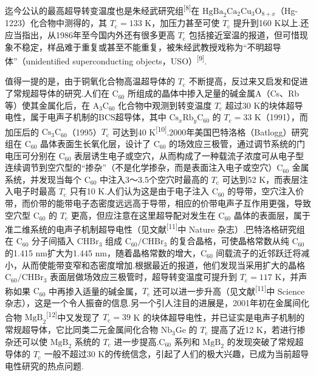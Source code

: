 迄今公认的最高超导转变温度也是朱经武研究组\textsuperscript{[8]}在 $\mathrm{HgBa}_{2}\mathrm{Ca}_{2}\mathrm{Cu}_{3}\mathrm{O}_{8+x}$（Hg-1223）化合物中测得的，其 $T_{\mathrm{c}}=133$ K，加压力甚至可使 $T_{\mathrm{c}}$ 提升到160 K以上.还应当指出，从1986年至今国内外还有很多更高 $T_{\mathrm{c}}$ 包括接近室温的报道，但可惜现象不稳定，样品难于重复或甚至不能重复，被朱经武教授戏称为“不明超导体”（unidentified superconducting objects，USO）\textsuperscript{[9]}.

值得一提的是，由于铜氧化合物高温超导体的 $T_{\mathrm{c}}$ 不断提高，反过来又启发和促进了常规超导体的研究.人们在 $\mathrm{C}_{60}$ 所组成的晶体中掺入足量的碱金属A（Cs、Rb等）使其金属化后，在 $\mathrm{A}_{3}\mathrm{C}_{60}$ 化合物中观测到转变温度 $T_{\mathrm{c}}$ 超过30 K的块体超导电性，属于电声子机制的BCS超导体，其中 $\mathrm{Cs}_{x}\mathrm{Rb}_{y}\mathrm{C}_{60}$ 的 $T_{\mathrm{c}}=33$ K（1991），而加压后的 $\mathrm{Cs}_{3}\mathrm{C}_{60}$（1995）$T_{\mathrm{c}}$ 可达到40 K\textsuperscript{[10]}.2000年美国巴特洛格（Batlogg）研究组在 $\mathrm{C}_{60}$ 晶体表面生长氧化层，设计了 $\mathrm{C}_{60}$ 的场效应三极管，通过调节系统的门电压可分别在 $\mathrm{C}_{60}$ 表层诱生电子或空穴，从而构成了一种载流子浓度可从电子型连续调节到空穴型的“掺杂”（不是化学掺杂，而是表面注入电子或空穴）$\mathrm{C}_{60}$ 金属系统，并发现当每个 $\mathrm{C}_{60}$ 中注入3～3.5个空穴时最高的 $T_{\mathrm{c}}$ 可达到52 K，而表层注入电子时最高 $T_{\mathrm{c}}$ 只有10 K.人们认为这是由于电子注入 $\mathrm{C}_{60}$ 的导带，空穴注入价带，而价带的能带电子态密度远远高于导带，相应的价带电声子互作用更强，导致空穴型 $\mathrm{C}_{60}$ 的 $T_{\mathrm{c}}$ 更高，但应注意在这里超导配对发生在 $\mathrm{C}_{60}$ 晶体的表面层，属于准二维系统的电声子机制超导电性（见文献\textsuperscript{[11]}中 Nature 杂志）.巴特洛格研究组在 $\mathrm{C}_{60}$ 分子间插入 $\mathrm{CHBr}_{3}$ 组成 $\mathrm{C}_{60}/\mathrm{CHBr}_{3}$ 的复合晶格，可使晶格常数从纯 $\mathrm{C}_{60}$ 的1.415 nm扩大为1.445 nm，随着晶格常数的增大，$\mathrm{C}_{60}$ 间载流子的近邻跃迁将减小，从而使能带变窄和态密度增加.根据最近的报道，他们发现当采用扩大的晶格 $\mathrm{C}_{60}/\mathrm{CHBr}_{3}$ 表面层做场效应三极管时，超导转变温度可提升到 $T_{\mathrm{c}}=117$ K，并声称如果 $\mathrm{C}_{60}$ 中再掺入适量的碱金属，$T_{\mathrm{c}}$ 还可以进一步升高（见文献\textsuperscript{[11]}中 Science 杂志），这是一个令人振奋的信息.另一个引人注目的进展是，2001年初在金属间化合物 $\mathrm{MgB}_{2}$\textsuperscript{[12]}中又发现了 $T_{\mathrm{c}}=39$ K 的块体超导电性，并已证实是电声子机制的常规超导体，它比同类二元金属间化合物 $\mathrm{Nb}_{3}\mathrm{Ge}$ 的 $T_{\mathrm{c}}$ 提高了近12 K，若进行掺杂还可以使 $\mathrm{MgB}_{2}$ 系统的 $T_{\mathrm{c}}$ 进一步提高.$\mathrm{C}_{60}$ 系列和 $\mathrm{MgB}_{2}$ 的发现突破了常规超导体的 $T_{\mathrm{c}}$ 一般不超过30 K的传统信念，引起了人们的极大兴趣，已成为当前超导电性研究的热点问题.

